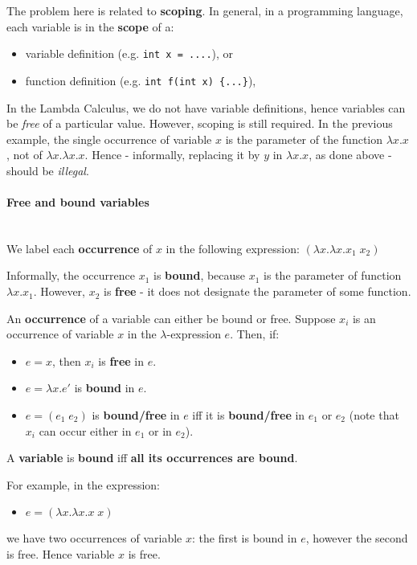 The problem here is related to \textbf{scoping}. In general, in a programming language, each variable is in the \textbf{scope} of a:
\begin{itemize}
	\item  variable definition (e.g. \texttt{int x = ....}), or
	\item  function definition (e.g. \texttt{int f(int x) \{...\}}),
\end{itemize}

In the Lambda Calculus, we do not have variable definitions, hence variables can be \textit{free} of a particular value. However, scoping is still required. In the previous example, the single occurrence of variable $x$ is the parameter of the function $\lambda x.x$, not of $\lambda x.\lambda x.x$. Hence - informally, replacing it by $y$ in $\lambda x.x$, as done above - should be \textit{illegal}.

\paragraph{ Free and bound variables }\hfill\\

We label each \textbf{occurrence} of $x$ in the following expression:
$(\lambda x.\lambda x.x_1\;x_2)$

Informally, the occurrence $x_1$ is \textbf{bound}, because $x_1$ is the parameter of function $\lambda x.x_1$. However, $x_2$ is \textbf{free} - it does not designate the parameter of some function.

An \textbf{occurrence} of a variable can either be bound or free.
Suppose $x_i$ is an occurrence of variable $x$ in the $\lambda$-expression $e$. Then, if:
\begin{itemize}
	\item  $e=x$, then $x_i$ is \textbf{free} in $e$.
	\item  $e=\lambda x.e'$ is \textbf{bound} in $e$.
	\item  $e=(e_1\;e_2)$ is \textbf{bound/free} in $e$ iff it is \textbf{bound/free} in $e_1$ or $e_2$ (note that $x_i$ can occur either in $e_1$ or in $e_2$).
\end{itemize}

A \textbf{variable} is \textbf{bound} iff \textbf{all its occurrences are bound}.

For example, in the expression:
\begin{itemize}
	\item  $e = (\lambda x.\lambda x.x\;x)$
\end{itemize}
we have two occurrences of variable $x$: the first is bound in $e$, however the second is free. Hence variable $x$ is free.

